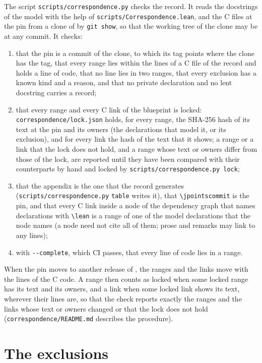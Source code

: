 The script \verb|scripts/correspondence.py| checks the record. It reads the docstrings of the model
with the help of \verb|scripts/Correspondence.lean|, and the C files at the pin from a clone of
\jpoints{} by \verb|git show|, so that the working tree of the clone may be at any commit. It
checks:
\begin{enumerate}
  \item that the pin is a commit of the clone, to which its tag points where the clone has the tag,
    that every range lies within the lines of a C file of the record and holds a line of code, that
    no line lies in two ranges, that every exclusion has a known kind and a reason, and that no
    private declaration and no lent docstring carries a record;
  \item that every range and every C link of the blueprint is locked:
    \verb|correspondence/lock.json| holds, for every range, the SHA-256 hash of its text at the pin
    and its owners (the declarations that model it, or its exclusion), and for every link the hash
    of the text that it shows; a range or a link that the lock does not hold, and a range whose text
    or owners differ from those of the lock, are reported until they have been compared with their
    counterparts by hand and locked by \verb|scripts/correspondence.py lock|;
  \item that the appendix is the one that the record generates (\verb|scripts/correspondence.py|
    \verb|table| writes it), that \verb|\jpointscommit| is the pin, and that every C link inside a
    node of the dependency graph that names declarations with \verb|\lean| is a range of one of the
    model declarations that the node names (a node need not cite all of them; prose and remarks may
    link to any lines);
  \item with \verb|--complete|, which CI passes, that every line of code lies in a range.
\end{enumerate}
When the pin moves to another release of \jpoints{}, the ranges and the links move with the lines of
the C code. A range then counts as locked when some locked range has its text and its owners, and a
link when some locked link shows its text, wherever their lines are, so that the check reports
exactly the ranges and the links whose text or owners changed or that the lock does not hold
(\verb|correspondence/README.md| describes the procedure).

\section{The exclusions}\label{sec:ccodeExclusions}

